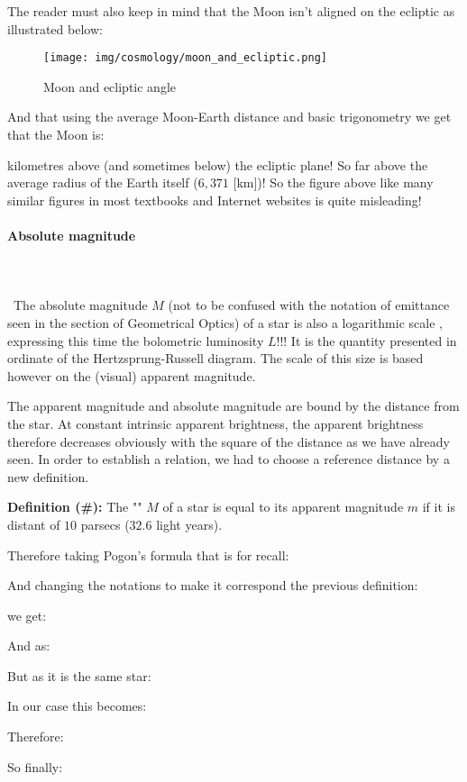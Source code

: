 	The reader must also keep in mind that the Moon isn't aligned on the ecliptic as illustrated below:
	\begin{figure}[H]
		\centering
		\texttt{[image: img/cosmology/moon\_and\_ecliptic.png]}
		\caption{Moon and ecliptic angle}
	\end{figure}
	And that using the average Moon-Earth distance and basic trigonometry we get that the Moon is:
	
	kilometres above (and sometimes below) the ecliptic plane! So far above the average radius of the Earth itself ($6,371$ [km])! So the figure above like many similar figures in most textbooks and Internet websites is quite misleading!
	
	\paragraph{Absolute magnitude}\mbox{}\\\\\
	The absolute magnitude $M$ (not to be confused with the notation of emittance seen in the section of Geometrical Optics) of a star is also a logarithmic scale , expressing this time the bolometric luminosity $L$!!! It is the quantity presented in ordinate of the Hertzsprung-Russell diagram. The scale of this size is based however on the (visual) apparent magnitude.

	The apparent magnitude and absolute magnitude are bound by the distance from the star. At constant intrinsic apparent brightness, the apparent brightness therefore decreases obviously with the square of the distance as we have already seen. In order to establish a relation, we had to choose a reference distance by a new definition.

	\textbf{Definition (\#\mydef):} The "" $M$ of a star is equal to its apparent magnitude $m$ if it is distant of $10$ parsecs ($32.6$ light years).
	
	Therefore taking Pogon's formula that is for recall:
	
	And changing the notations to make it correspond the previous definition:
	
	we get:
	
	And as:
	
	But as it is the same star:
	
	In our case this becomes:
	
	Therefore:
	
	So finally:
	
